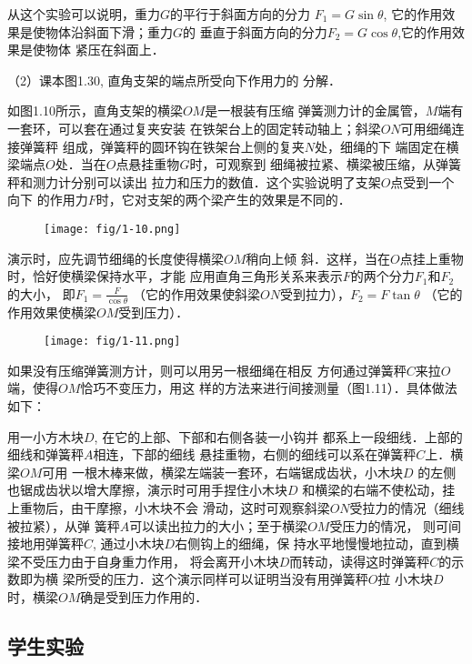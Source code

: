 从这个实验可以说明，重力$G$的平行于斜面方向的分力
$F_1=G\sin\theta$, 它的作用效果是使物体沿斜面下滑；重力$G$的
垂直于斜面方向的分力$F_2=G\cos\theta$,它的作用效果是使物体
紧压在斜面上．

（2）课本图1.30, 直角支架的端点所受向下作用力的
分解．

如图1.10所示，直角支架的横梁$OM$是一根装有压缩
弹簧测力计的金属管，$M$端有一套环，可以套在通过复夹安装
在铁架台上的固定转动轴上；斜梁$ON$可用细绳连接弹簧秤
组成，弹簧秤的圆环钩在铁架台上侧的复夹$N$处，细绳的下
端固定在横梁端点$O$处．当在$O$点悬挂重物$G$时，可观察到
细绳被拉紧、横梁被压缩，从弹簧秤和测力计分别可以读出
拉力和压力的数值．这个实验说明了支架$O$点受到一个向下
的作用力$F$时，它对支架的两个梁产生的效果是不同的．
\begin{figure}[htp]
    \centering
    \texttt{[image: fig/1-10.png]}
    \caption{}
\end{figure}

演示时，应先调节细绳的长度使得横梁$OM$稍向上倾
斜．这样，当在$O$点挂上重物时，恰好使横梁保持水平，才能
应用直角三角形关系来表示$F$的两个分力$F_1$和$F_2$的大小，
即$F_1=\frac{F}{\cos\theta}$
（它的作用效果使斜梁$ON$受到拉力），$F_2=F\tan\theta$
（它的作用效果使横梁$OM$受到压力）．
\begin{figure}[htp]
    \centering
    \texttt{[image: fig/1-11.png]}
    \caption{}
\end{figure}

如果没有压缩弹簧测方计，则可以用另一根细绳在相反
方何通过弹簧秤$C$来拉$O$端，使得$OM$恰巧不变压力，用这
样的方法来进行间接测量（图1.11）．具体做法如下：

用一小方木块$D$, 在它的上部、下部和右侧各装一小钩并
都系上一段细线．上部的细线和弹簧秤$A$相连，下部的细线
悬挂重物，右侧的细线可以系在弹簧秤$C$上．横梁$OM$可用
一根木棒来做，横梁左端装一套环，右端锯成齿状，小木块$D$
的左侧也锯成齿状以增大摩擦，演示时可用手捏住小木块$D$
和横梁的右端不使松动，挂上重物后，由干摩擦，小木块不会
滑动，这时可观察斜梁$ON$受拉力的情况（细线被拉紧），从弹
簧秤$A$可以读出拉力的大小；至于横梁$OM$受压力的情况，
则可间接地用弹簧秤$C$, 通过小木块$D$右侧钩上的细绳，保
持水平地慢慢地拉动，直到横梁不受压力由于自身重力作用，
将会离开小木块$D$而转动，读得这时弹簧秤$C$的示数即为横
梁所受的压力．这个演示同样可以证明当没有用弹簧秤$O$拉
小木块$D$时，横梁$OM$确是受到压力作用的．

\subsection{学生实验}
